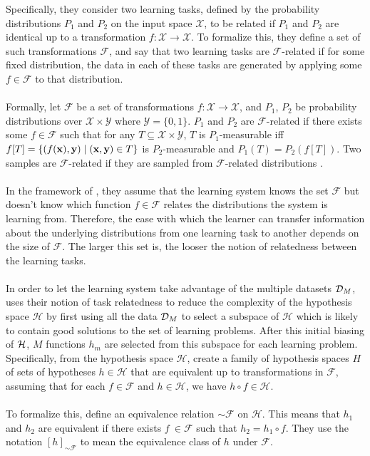 Specifically, they consider two learning tasks, defined by the probability distributions $P_1$ and $P_2$ on the input space $\mathcal{X}$, to be related if $P_1$ and $P_2$ are identical up to a transformation $f: \mathcal{X} \to \mathcal{X}$. To formalize this, they define a set of such transformations $\mathcal{F}$, and say that two learning tasks are $\mathcal{F}$-related if for some fixed distribution, the data in each of these tasks are generated by applying some $f \in \mathcal{F}$ to that distribution.
\\\\
Formally, let $\mathcal{F}$ be a set of transformations $f: \mathcal{X} \to \mathcal{X}$, and $P_1$, $P_2$ be probability distributions over $\mathcal{X} \times \mathcal{Y}$ where $\mathcal{Y} = \{0,1\}$. $P_1$ and $P_2$ are $\mathcal{F}$-related if there exists some $f \in \mathcal{F}$ such that for any $T \subseteq \mathcal{X} \times \mathcal{Y}$, $T$ is $P_1$-measurable iff $f[T] = \{(f(\mathbf{x}), \mathbf{y}) \mid (\mathbf{x}, \mathbf{y}) \in T\}$ is $P_2$-measurable and $P_1(T) = P_2(f[T])$. Two samples are $\mathcal{F}$-related if they are sampled from $\mathcal{F}$-related distributions \citep{ben2003}.
\\\\
In the framework of \citet{ben2003}, they assume that the learning system knows the set $\mathcal{F}$ but doesn't know which function $f \in \mathcal{F}$ relates the distributions the system is learning from. Therefore, the ease with which the learner can transfer information about the underlying distributions from one learning task to another depends on the size of $\mathcal{F}$. The larger this set is, the looser the notion of relatedness between the learning tasks.
\\\\
In order to let the learning system take advantage of the multiple datasets $\mathcal{D}_M$, \citet{ben2003} uses their notion of task relatedness to reduce the complexity of the hypothesis space $\mathcal{H}$ by first using all the data $\mathcal{D}_M$ to select a subspace of $\mathcal{H}$ which is likely to contain good solutions to the set of learning problems. After this initial biasing of $\mathcal{H}$, $M$ functions $h_m$ are selected from this subspace for each learning problem. Specifically, from the hypothesis space $\mathcal{H}$, create a family of hypothesis spaces $H$ of sets of hypotheses $h \in \mathcal{H}$ that are equivalent up to transformations in $\mathcal{F}$, assuming that for each $f \in \mathcal{F}$ and $h \in \mathcal{H}$, we have $h \circ f \in \mathcal{H}$. 
\\\\
To formalize this, \citet{ben2003} define an equivalence relation $\sim \mathcal{F}$ on $\mathcal{H}$. This means that $h_1$ and $h_2$ are equivalent if there exists $f\ \in \mathcal{F}$ such that $h_2 = h_1 \circ f$. They use the notation $[h]_{\sim \mathcal{F}}$ to mean the equivalence class of $h$ under $\mathcal{F}$. 

